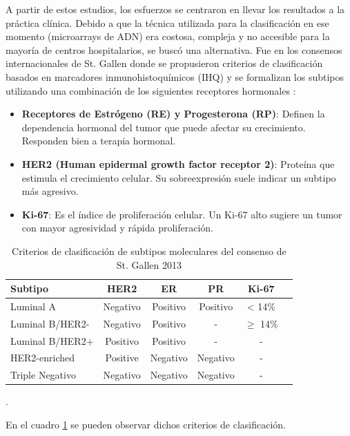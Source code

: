 \documentclass[a4paper,10pt]{book}
\begin{document}
A partir de estos estudios, los esfuerzos se centraron en llevar los resultados a la práctica clínica. Debido a que la técnica utilizada para la clasificación en ese momento (microarrays de ADN) era costosa, compleja y no accesible para la mayoría de centros hospitalarios, se buscó una alternativa. Fue en los consensos internacionales de St. Gallen donde se propusieron criterios de clasificación basados en marcadores inmunohistoquímicos (IHQ) y se formalizan los subtipos utilizando una combinación de los siguientes receptores hormonales \cite{lips_breast_2013}:

\begin{itemize}
    \item \textbf{Receptores de Estrógeno (RE) y Progesterona (RP)}: Definen la dependencia hormonal del tumor que puede afectar su crecimiento. Responden bien a terapia hormonal.
    \item \textbf{HER2 (Human epidermal growth factor receptor 2)}: Proteína que estimula el crecimiento celular. Su sobreexpresión suele indicar un subtipo más agresivo.
    \item \textbf{Ki-67}: Es el índice de proliferación celular. Un Ki-67 alto sugiere un tumor con mayor agresividad y rápida proliferación.
\end{itemize}

\begin{table}
    \centering
    \begin{tabular}{lccccc}
        \toprule
        \textbf{Subtipo} & \textbf{HER2} & \textbf{ER} & \textbf{PR} & \textbf{Ki-67} \\
        \midrule
        Luminal A & Negativo & Positivo & Positivo & < 14\% \\
        Luminal B/HER2- & Negativo & Positivo & - & $\geq$ 14\% \\
        Luminal B/HER2+ & Positivo & Positivo & - & - \\
        HER2-enriched & Positive & Negativo & Negativo & - \\
        Triple Negativo & Negativo & Negativo & Negativo & - \\
        \bottomrule
    \end{tabular}
    \caption{Criterios de clasificación de subtipos moleculares del consenso de St. Gallen 2013 \cite{goldhirsch_personalizing_2013}}.
    \label{tab:molecular_subtypes_comb}
\end{table}

En el cuadro \ref{tab:molecular_subtypes_comb} se pueden observar dichos criterios de clasificación.
\end{document}
